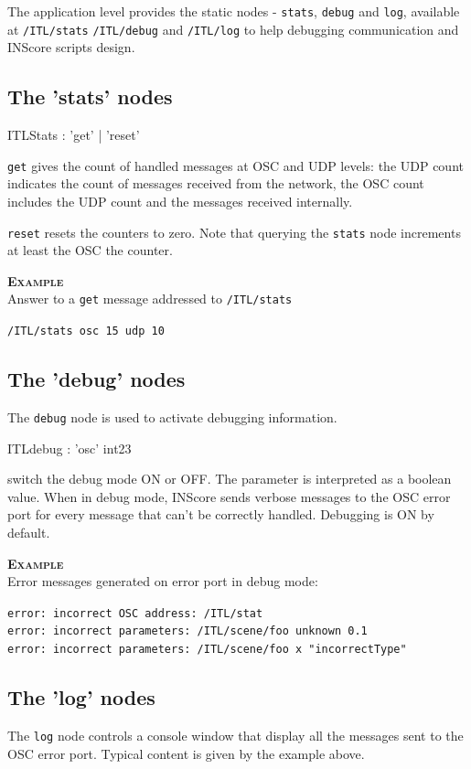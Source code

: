 \documentclass[a4paper,twoside]{report}
\newcommand{\subsublevel}[1]	{\subsection{#1}}
\newcommand{\OSC}[1]		{\texttt{#1}}
\newcommand{\example}		{\textbf{\hspace{-1.5cm}\textbf{\textsc{Example }}}}
\let\olditemize\itemize
\let\oldenditemize\enditemize
\renewenvironment{itemize} 	{\olditemize \setlength{\itemsep}{1mm}}{\oldenditemize}
\newcommand{\sample}	[1]			{\vspace{-2mm}\begin{center}\colorbox{mygrey}{
								\begin{minipage}[t]{0.9\columnwidth} 
								{\small \texttt{#1}}
								\end{minipage}}\end{center}}
\begin{document}
The application level provides the static nodes - \OSC{stats}, \OSC{debug} and \OSC{log}, available at \OSC{/ITL/stats} \OSC{/ITL/debug} and \OSC{/ITL/log}  to help debugging communication and INScore scripts design.

\subsublevel{The 'stats' nodes}
\label{ITLstat}

\begin{rail}
ITLStats : 'get'  | 'reset'
\end{rail}

\begin{itemize}
\item \OSC{get} gives the count of handled messages at OSC and UDP levels: the UDP count indicates the count of messages received from the network, the OSC count includes the UDP count and the messages received internally.
\item \OSC{reset} resets the counters to zero. Note that querying the \OSC{stats} node increments at least the OSC the counter.
\end{itemize}

\example \\
Answer to a \OSC{get} message addressed to \OSC{/ITL/stats}
\sample{/ITL/stats osc 15 udp 10}


\subsublevel{The 'debug' nodes}
\label{ITLdebug}

The \OSC{debug} node is used to activate debugging information.
\begin{rail}
ITLdebug : 'osc' int23
\end{rail}

\begin{itemize}
\item switch the debug mode ON or OFF. The parameter is interpreted as a boolean value. When in debug mode, INScore sends verbose messages to the OSC error port for every message that can't be correctly handled. Debugging is ON by default.
\end{itemize}

\example \\
Error messages generated on error port in debug mode:
\sample{error:  incorrect OSC address: /ITL/stat\\
error:  incorrect parameters: /ITL/scene/foo unknown 0.1\\
error:  incorrect parameters: /ITL/scene/foo x "incorrectType"
}


\subsublevel{The 'log' nodes}
\label{ITLlog}

The \OSC{log} node controls a console window that display all the messages sent to the OSC error port. Typical content is given by the example above.
\end{document}
